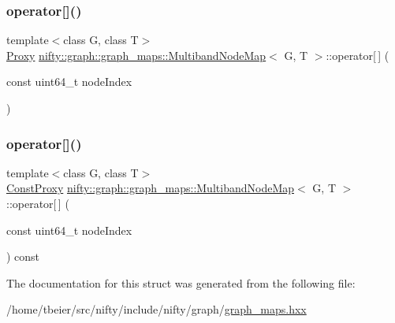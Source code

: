\mbox{\label{structnifty_1_1graph_1_1graph__maps_1_1MultibandNodeMap_a568a4290cfbdbf50e9c62e5f64d21a2a}} 
\subsubsection{\texorpdfstring{operator[]()}{operator[]()}\hspace{0.1cm}{\footnotesize\ttfamily [1/2]}}
{\footnotesize\ttfamily template$<$class G, class T$>$ \\
\hyperlink{classnifty_1_1graph_1_1graph__maps_1_1MultibandNodeMap_1_1Proxy}{Proxy} \hyperlink{structnifty_1_1graph_1_1graph__maps_1_1MultibandNodeMap}{nifty\+::graph\+::graph\+\_\+maps\+::\+Multiband\+Node\+Map}$<$ G, T $>$\+::operator\mbox{[}$\,$\mbox{]} (\begin{DoxyParamCaption}\item[{const uint64\+\_\+t}]{node\+Index }\end{DoxyParamCaption})\hspace{0.3cm}{\ttfamily [inline]}}

\mbox{\label{structnifty_1_1graph_1_1graph__maps_1_1MultibandNodeMap_a882761915ba7197aed37e067dbc279f1}} 
\subsubsection{\texorpdfstring{operator[]()}{operator[]()}\hspace{0.1cm}{\footnotesize\ttfamily [2/2]}}
{\footnotesize\ttfamily template$<$class G, class T$>$ \\
\hyperlink{classnifty_1_1graph_1_1graph__maps_1_1MultibandNodeMap_1_1ConstProxy}{Const\+Proxy} \hyperlink{structnifty_1_1graph_1_1graph__maps_1_1MultibandNodeMap}{nifty\+::graph\+::graph\+\_\+maps\+::\+Multiband\+Node\+Map}$<$ G, T $>$\+::operator\mbox{[}$\,$\mbox{]} (\begin{DoxyParamCaption}\item[{const uint64\+\_\+t}]{node\+Index }\end{DoxyParamCaption}) const\hspace{0.3cm}{\ttfamily [inline]}}



The documentation for this struct was generated from the following file\+:\begin{DoxyCompactItemize}
\item 
/home/tbeier/src/nifty/include/nifty/graph/\hyperlink{graph__maps_8hxx}{graph\+\_\+maps.\+hxx}\end{DoxyCompactItemize}
